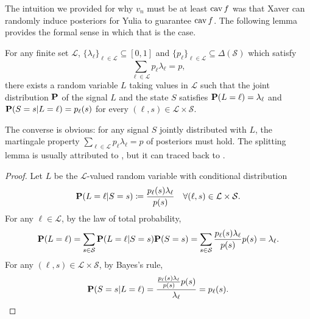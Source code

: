 \documentclass[11pt,letterpaper,reqno,oneside]{article}
\begin{document}
The intuition we provided for why $v_n$ must be at least $\operatorname*{cav} f$ was that Xaver can randomly induce posteriors for Yulia to guarantee $\operatorname*{cav} f$. The following lemma provides the formal sense in which that is the case.
%
\begin{lemma}
	For any finite set $\mathcal{L}$, $\{ \lambda_\ell \}_{\ell \in \mathcal{L}} \subseteq [0,1]$ and $\{ p_\ell \}_{\ell \in \mathcal{L}} \subseteq \Delta(\mathcal{S})$ which satisfy
	\begin{equation*}
		\sum_{ \ell \in \mathcal{L} } p_\ell \lambda_\ell 
		= p ,
	\end{equation*}
	there exists a random variable $L$ taking values in $\mathcal{L}$ such that the joint distribution $\mathbf{P}$ of the signal $L$ and the state $S$ satisfies $\mathbf{P}(L=\ell) = \lambda_\ell$ and $\mathbf{P}(S=s|L=\ell) = p_\ell(s)$ for every $(\ell,s) \in \mathcal{L} \times \mathcal{S}$.
\end{lemma}

The converse is obvious: for any signal $S$ jointly distributed with $L$, the martingale property $\sum_{\ell \in \mathcal{L}} p_\ell \lambda_\ell = p$ of posteriors must hold. The splitting lemma is usually attributed to \textcite{AumannMaschler1995}, but it can traced back to \textcite{Blackwell1951}.

\begin{proof}
	Let $L$ be the $\mathcal{L}$-valued random variable with conditional distribution
	\begin{equation*}
		\mathbf{P}(L=\ell|S=s) \coloneqq \frac{ p_\ell(s) \lambda_\ell }{ p(s) } 
		\quad\forall (\ell,s) \in \mathcal{L} \times \mathcal{S} .
	\end{equation*}
	For any $\ell \in \mathcal{L}$, by the law of total probability,
	\begin{equation*}
		\mathbf{P}( L=\ell ) 
		= \sum_{ s \in \mathcal{S} } \mathbf{P}( L=\ell | S=s ) \mathbf{P}( S=s )
		= \sum_{ s \in \mathcal{S} } \frac{ p_\ell(s) \lambda_\ell }{ p(s) } p(s)
		= \lambda_\ell .
	\end{equation*}
	For any $(\ell,s) \in \mathcal{L} \times \mathcal{S}$, by Bayes's rule,
	\begin{equation*}
		\mathbf{P}( S=s | L=\ell ) 
		= \frac{ \frac{ p_\ell(s) \lambda_\ell }{ p(s) } p(s) }{ \lambda_\ell }
		= p_\ell(s) . \qedhere
	\end{equation*}
\end{proof}
\end{document}
